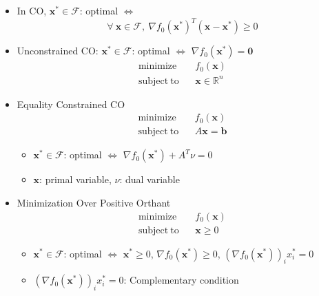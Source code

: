 \begin{itemize}
    \item In CO, $\mathbf{x}^{\ast} \in \mathcal{F}$: optimal $\Leftrightarrow$
    \begin{equation}
        \forall~\mathbf{x} \in \mathcal{F},~\nabla f_0 \left(\mathbf{x}^{\ast}\right)^T \left( \mathbf{x} - \mathbf{x}^{\ast} \right) \geq 0
    \end{equation}
    \item Unconstrained CO: $\mathbf{x}^{\ast} \in \mathcal{F}$: optimal
        $\Leftrightarrow$ $\nabla f_0 \left(\mathbf{x}^{\ast}\right) = \mathbf{0}$
    \begin{equation}\begin{aligned}
        \mathrm{minimize}~~&~~f_0(\mathbf{x}) \\
        \mathrm{subject~to}~~&~~\mathbf{x} \in \mathbb{R}^n
    \end{aligned}\end{equation}
    \item Equality Constrained CO
    \begin{equation}\begin{aligned}
        \mathrm{minimize}~~&~~f_0(\mathbf{x}) \\
        \mathrm{subject~to}~~&~~A\mathbf{x} = \mathbf{b}
    \end{aligned}\end{equation}
    \begin{itemize}
        \item $\mathbf{x}^{\ast} \in \mathcal{F}$: optimal $\Leftrightarrow$
            $\nabla f_0 \left(\mathbf{x}^{\ast}\right) + A^T \nu = 0$
        \item $\mathbf{x}$: primal variable, $\nu$: dual variable
    \end{itemize}
    \item Minimization Over Positive Orthant
    \begin{equation}\begin{aligned}
        \mathrm{minimize}~~&~~f_0(\mathbf{x}) \\
        \mathrm{subject~to}~~&~~\mathbf{x} \geq 0
    \end{aligned}\end{equation}
    \begin{itemize}
        \item $\mathbf{x}^{\ast} \in \mathcal{F}$: optimal $\Leftrightarrow$ $\mathbf{x}^{\ast} \geq 0$,
            $\nabla f_0 \left(\mathbf{x}^{\ast}\right) \geq 0$, $\left(\nabla f_0\left(\mathbf{x}^{\ast}\right)\right)_i x_i^{\ast} = 0$
        \item $\left(\nabla f_0\left(\mathbf{x}^{\ast}\right)\right)_i x_i^{\ast} = 0$: Complementary condition
    \end{itemize}
\end{itemize}
\newpage

